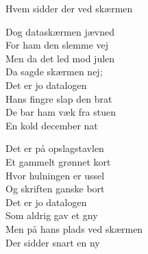 \begin{song}{Hvem sidder der ved skærmen}
  \begin{SBVerse}
    Dog dataskærmen jævned\\
    For ham den slemme vej\\
    Men da det led mod julen\\
    Da sagde skærmen nej;\\
    \medskip
    Det er jo datalogen\\
    Hans fingre slap den brat\\
    De bar ham væk fra stuen\\
    En kold december nat
  \end{SBVerse}

  \begin{SBVerse}
    Det er på opslagstavlen\\
    Et gammelt grønnet kort\\
    Hvor hulningen er ussel\\
    Og skriften ganske bort\\
    \medskip
    Det er jo datalogen\\
    Som aldrig gav et gny\\
    Men på hans plads ved skærmen\\
    Der sidder snart en ny
  \end{SBVerse}
\end{song}